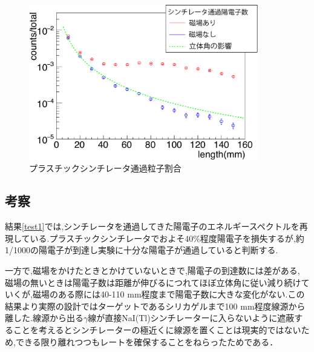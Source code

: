 \begin{figure}[htbp]
	\centering
		\includegraphics[width=10cm]{fig/scinti_test.pdf}
	\caption{プラスチックシンチレータ通過粒子割合}
	\label{scinti_test}
\end{figure}

\subsection{考察}

結果\ref{test1}では,シンチレータを通過してきた陽電子のエネルギースペクトルを再現している.プラスチックシンチレータでおよそ40\%程度陽電子を損失するが,約1/1000の陽電子が到達し実験に十分な陽電子が通過していると判断する.

一方で,磁場をかけたときとかけていないときで,陽電子の到達数には差がある,
磁場の無いときは陽電子数は距離が伸びるにつれてほぼ立体角に従い減り続けていくが,磁場のある際には40-110 mm程度まで陽電子数に大きな変化がない.この結果より実際の設計ではターゲットであるシリカゲルまで100 mm程度線源から離した.線源から出る$\gamma$線が直接NaI(Tl)シンチレーターに入らないように遮蔽することを考えるとシンチレーターの極近くに線源を置くことは現実的ではないため,できる限り離れつつもレートを確保することをねらったためである．

